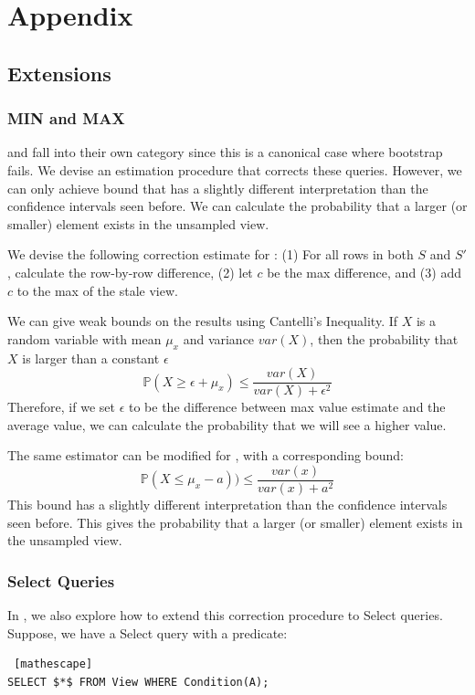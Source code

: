 \section{Appendix}

\subsection{Extensions}
\subsubsection{MIN and MAX}
\minfunc and \maxfunc fall into their own category since this is a canonical case where bootstrap fails.
We devise an estimation procedure that corrects these queries.
However, we can only achieve bound that has a slightly different interpretation than the confidence intervals seen before.
We can calculate the probability that a larger (or smaller) element exists in the unsampled view.

We devise the following correction estimate for \maxfunc: (1) For all rows in both $S$ and $S'$, calculate the row-by-row difference, (2) let $c$ be the max difference, and (3) add $c$ to the max of the stale view.

We can give weak bounds on the results using Cantelli's Inequality.
If $X$ is a random variable with mean $\mu_x$ and variance $var(X)$, then the probability that $X$ is larger than a constant $\epsilon$ 
\[
\mathbb{P}(X \ge \epsilon + \mu_x ) \le \frac{var(X)}{var(X) + \epsilon^2}
\]
Therefore, if we set $\epsilon$ to be the difference between max value estimate and the average value, we can calculate the probability that we will see a higher value. 

The same estimator can be modified for \minfunc, with a corresponding bound:
\[
\mathbb{P}(X \le \mu_x - a )) \le \frac{var(x)}{var(x) + a^2}
\]
This bound has a slightly different interpretation than the confidence intervals seen before.
This gives the probability that a larger (or smaller) element exists in the unsampled view.


\vspace{-.25em}
\subsubsection{Select Queries}
In \svc, we also explore how to extend this correction procedure to Select queries.
Suppose, we have a Select query with a predicate:
\begin{lstlisting} [mathescape]
SELECT $*$ FROM View WHERE Condition(A);
\end{lstlisting}

